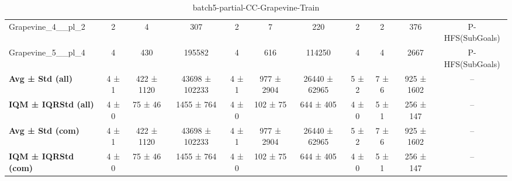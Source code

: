 \begin{table}[!ht]
\begin{tabular}{l|ccc|ccc|cccc}
Grapevine\_4\_\_pl\_2 & 2 & 4 & 307 & 2 & 7 & 220 & 2 & 2 & 376 & P-HFS(SubGoals) \\
Grapevine\_5\_\_pl\_4 & 4 & 430 & 195582 & 4 & 616 & 114250 & 4 & 4 & 2667 & P-HFS(SubGoals) \\
\hline
\textbf{Avg ± Std (all)} & 4 ± 1 & 422 ± 1120 & 43698 ± 102233 & 4 ± 1 & 977 ± 2904 & 26440 ± 62965 & 5 ± 2 & 7 ± 6 & 925 ± 1602 & -- \\
\textbf{IQM ± IQRStd (all)} & 4 ± 0 & 75 ± 46 & 1455 ± 764 & 4 ± 0 & 102 ± 75 & 644 ± 405 & 4 ± 0 & 5 ± 1 & 256 ± 147 & -- \\
\textbf{Avg ± Std (com)} & 4 ± 1 & 422 ± 1120 & 43698 ± 102233 & 4 ± 1 & 977 ± 2904 & 26440 ± 62965 & 5 ± 2 & 7 ± 6 & 925 ± 1602 & -- \\
\textbf{IQM ± IQRStd (com)} & 4 ± 0 & 75 ± 46 & 1455 ± 764 & 4 ± 0 & 102 ± 75 & 644 ± 405 & 4 ± 0 & 5 ± 1 & 256 ± 147 & -- \\
\end{tabular}
\caption{batch5-partial-CC-Grapevine-Train}
\label{tab:batch5_partial_CC-Grapevine_comparison_train}
\end{table}

